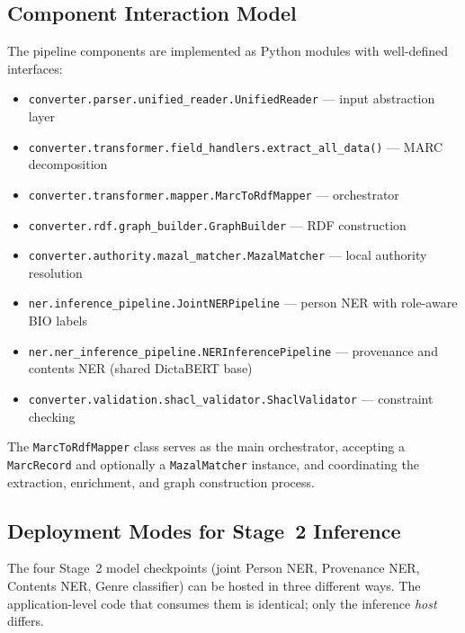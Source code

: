\documentclass[12pt]{article}
\newcommand{\code}[1]{\texttt{#1}}
\begin{document}
\subsection{Component Interaction Model}

The pipeline components are implemented as Python modules with well-defined interfaces:

\begin{itemize}
\item \code{converter.parser.unified\_reader.UnifiedReader} --- input abstraction layer
\item \code{converter.transformer.field\_handlers.extract\_all\_data()} --- MARC decomposition
\item \code{converter.transformer.mapper.MarcToRdfMapper} --- orchestrator
\item \code{converter.rdf.graph\_builder.GraphBuilder} --- RDF construction
\item \code{converter.authority.mazal\_matcher.MazalMatcher} --- local authority resolution
\item \code{ner.inference\_pipeline.JointNERPipeline} --- person NER with role-aware BIO labels
\item \code{ner.ner\_inference\_pipeline.NERInferencePipeline} --- provenance and contents NER (shared DictaBERT base)
\item \code{converter.validation.shacl\_validator.ShaclValidator} --- constraint checking
\end{itemize}

The \code{MarcToRdfMapper} class serves as the main orchestrator, accepting a \code{MarcRecord} and optionally a \code{MazalMatcher} instance, and coordinating the extraction, enrichment, and graph construction process.

\subsection{Deployment Modes for Stage~2 Inference}
\label{sec:deployment-modes}

The four Stage~2 model checkpoints (joint Person NER, Provenance NER, Contents NER, Genre classifier) can be hosted in three different ways. The application-level code that consumes them is identical; only the inference \emph{host} differs.
\end{document}
